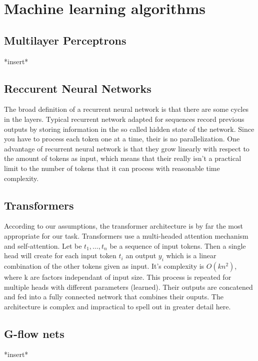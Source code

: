 \documentclass{article}
\begin{document}
\section*{Machine learning algorithms}
\subsection*{Multilayer Perceptrons}
*insert*
\subsection*{Reccurent Neural Networks}
The broad definition of a recurrent neural network 
is that there are some cycles in the layers. 
Typical recurrent network adapted for sequences 
record previous outputs by storing information in the so called
hidden state of the network. Since you have to process each token one at 
a time, their is no parallelization. 
One advantage of recurrent neural network is that they grow 
linearly with respect to the amount of tokens as input, which means 
that their really isn't a practical limit to the number of tokens that
it can process with reasonable time complexity. 
\subsection*{Transformers}
According to our assumptions, the transformer 
architecture \cite{transformers} is by far the most appropriate
for our task. Transformers use a multi-headed 
attention mechanism and self-attention. Let
be $t_1, \dots, t_n$ be a sequence of input tokens. Then a single 
head will create for each input token $t_i$ an output $y_i$ which is a 
linear combination of the other tokens given as input. It's complexity
is $O(kn^2)$, where k are factors independant of input size. This process is 
repeated for multiple heads with different parameters (learned). Their
outputs are concatened and fed into a fully connected network that combines 
their ouputs. The architecture is complex and impractical to spell out
in greater detail here.

\subsection*{G-flow nets}
*insert*
\end{document}
